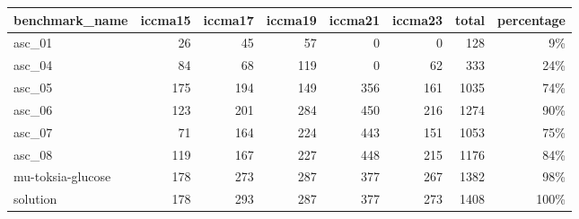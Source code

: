 \begin{tabular}{lrrrrrrr}
\toprule
benchmark_name & iccma15 & iccma17 & iccma19 & iccma21 & iccma23 & total & percentage \\
\midrule
asc_01 & 26 & 45 & 57 & 0 & 0 & 128 & 9\% \\
asc_04 & 84 & 68 & 119 & 0 & 62 & 333 & 24\% \\
asc_05 & 175 & 194 & 149 & 356 & 161 & 1035 & 74\% \\
asc_06 & 123 & 201 & 284 & 450 & 216 & 1274 & 90\% \\
asc_07 & 71 & 164 & 224 & 443 & 151 & 1053 & 75\% \\
asc_08 & 119 & 167 & 227 & 448 & 215 & 1176 & 84\% \\
mu-toksia-glucose & 178 & 273 & 287 & 377 & 267 & 1382 & 98\% \\
\midrule
solution & 178 & 293 & 287 & 377 & 273 & 1408 & 100\% \\
\bottomrule
\end{tabular}
